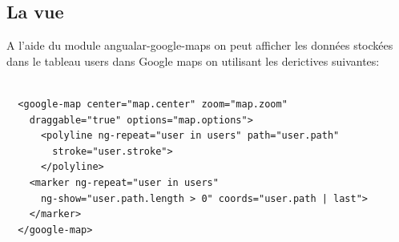 \documentclass[a4paper]{article}
\begin{document}
\subsection{La vue}

A l'aide du module angualar-google-maps on peut afficher les données stockées dans le 
tableau users dans Google maps on utilisant les derictives suivantes:

\begin{lstlisting}

  <google-map center="map.center" zoom="map.zoom" 
    draggable="true" options="map.options">
      <polyline ng-repeat="user in users" path="user.path" 
        stroke="user.stroke">
      </polyline>
    <marker ng-repeat="user in users" 
      ng-show="user.path.length > 0" coords="user.path | last">
    </marker>
  </google-map>
\end{lstlisting}
\end{document}
